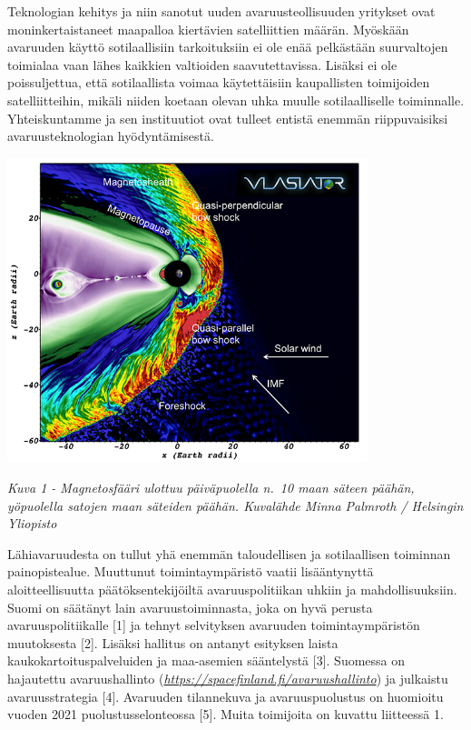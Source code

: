 \documentclass[nobib,finnish,oneside,openany,notoc,a4paper]{tufte-book}
\begin{document}
Teknologian kehitys ja niin sanotut uuden avaruusteollisuuden yritykset
ovat moninkertaistaneet maapalloa kiertävien satelliittien määrän.
Myöskään avaruuden käyttö sotilaallisiin tarkoituksiin ei ole enää
pelkästään suurvaltojen toimialaa vaan lähes kaikkien valtioiden
saavutettavissa. Lisäksi ei ole poissuljettua, että sotilaallista voimaa
käytettäisiin kaupallisten toimijoiden satelliitteihin, mikäli niiden
koetaan olevan uhka muulle sotilaalliselle toiminnalle. Yhteiskuntamme
ja sen instituutiot ovat tulleet entistä enemmän riippuvaisiksi
avaruusteknologian hyödyntämisestä.

\includegraphics[width=10.5cm]{image1.png}

\emph{Kuva 1 - Magnetosfääri ulottuu
päiväpuolella n.~10 maan säteen päähän, yöpuolella satojen maan säteiden
päähän. Kuvalähde Minna Palmroth / Helsingin Yliopisto}

Lähiavaruudesta on tullut yhä enemmän taloudellisen ja sotilaallisen
toiminnan painopistealue. Muuttunut toimintaympäristö vaatii
lisääntynyttä aloitteellisuutta päätöksentekijöiltä avaruuspolitiikan
uhkiin ja mahdollisuuksiin. Suomi on säätänyt lain avaruustoiminnasta,
joka on hyvä perusta avaruuspolitiikalle {[}1{]} ja tehnyt selvityksen
avaruuden toimintaympäristön muutoksesta {[}2{]}. Lisäksi hallitus on
antanyt esityksen laista kaukokartoituspalveluiden ja maa-asemien
sääntelystä {[}3{]}. Suomessa on hajautettu avaruushallinto
(\href{https://spacefinland.fi/avaruushallinto}{\emph{https://spacefinland.fi/avaruushallinto}})
ja julkaistu avaruusstrategia {[}4{]}. Avaruuden tilannekuva ja
avaruuspuolustus on huomioitu vuoden 2021 puolustusselonteossa {[}5{]}.
Muita toimijoita on kuvattu liitteessä 1.
\end{document}
